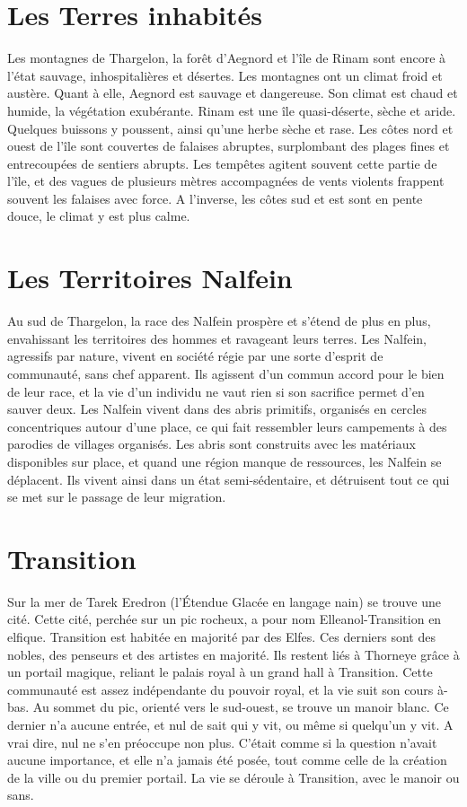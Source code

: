 \section{Les Terres inhabités}
Les montagnes de Thargelon, la forêt d'Aegnord et l'île de Rinam sont encore à l'état sauvage, inhospitalières et désertes. Les montagnes ont un climat froid et austère. Quant à elle, Aegnord est sauvage et dangereuse. Son climat est chaud et humide, la végétation exubérante. 
\newline
Rinam est une île quasi-déserte, sèche et aride. Quelques buissons y poussent, ainsi qu'une herbe sèche et rase. Les côtes nord et ouest de l'île sont couvertes de falaises abruptes, surplombant des plages fines et entrecoupées de sentiers abrupts. Les tempêtes agitent souvent cette partie de l'île, et des vagues de plusieurs mètres accompagnées de vents violents frappent souvent les falaises avec force. A l'inverse, les côtes sud et est sont en pente douce, le climat y est plus calme.
\section{Les Territoires Nalfein}
Au sud de Thargelon, la race des Nalfein prospère et s'étend de plus en plus, envahissant les territoires des hommes et ravageant leurs terres. Les Nalfein, agressifs par nature, vivent en société régie par une sorte d'esprit de communauté, sans chef apparent. Ils agissent d'un commun accord pour le bien de leur race, et la vie d'un individu ne vaut rien si son sacrifice permet d'en sauver deux. Les Nalfein vivent dans des abris primitifs, organisés en cercles concentriques autour d'une place, ce qui fait ressembler leurs campements à des parodies de villages organisés. Les abris sont construits avec les matériaux disponibles sur place, et quand une région manque de ressources, les Nalfein se déplacent. Ils vivent ainsi dans un état semi-sédentaire, et détruisent tout ce qui se met sur le passage de leur migration.
\section{Transition}
Sur la mer de Tarek Eredron (l'Étendue Glacée en langage nain) se trouve une cité. Cette cité, perchée sur un pic rocheux, a pour nom Elleanol-Transition en elfique. Transition est habitée en majorité par des Elfes. Ces derniers sont des nobles, des penseurs et des artistes en majorité. Ils restent liés à Thorneye grâce à un portail magique, reliant le palais royal à un grand hall à Transition. Cette communauté est assez indépendante du pouvoir royal, et la vie suit son cours à-bas.
\newline
Au sommet du pic, orienté vers le sud-ouest, se trouve un manoir blanc. Ce dernier n'a aucune entrée, et nul de sait qui y vit, ou même si quelqu'un y vit. A vrai dire, nul ne s'en préoccupe non plus. C'était comme si la question n'avait aucune importance, et elle n'a jamais été posée, tout comme celle de la création de la ville ou du premier portail. La vie se déroule à Transition, avec le manoir ou sans.